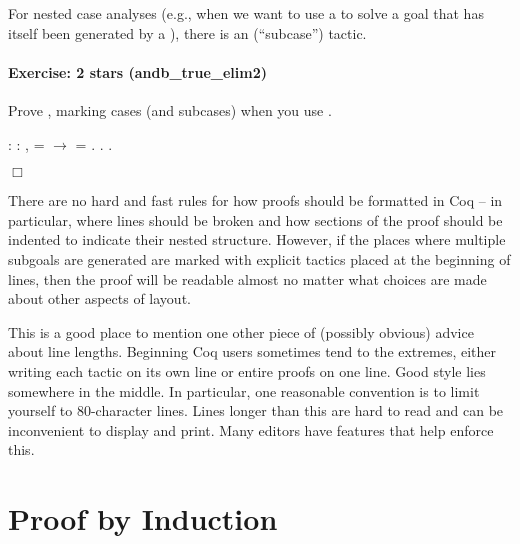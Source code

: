 \documentclass[12pt]{report}
\begin{document}
    For nested case analyses (e.g., when we want to use a 
    to solve a goal that has itself been generated by a ),
    there is an  (``subcase'') tactic. 

\paragraph{Exercise: 2 stars (andb\_true\_elim2)}

 Prove , marking cases (and subcases) when
    you use . \begin{coqdoccode}
\coqdocemptyline
\coqdocnoindent
{}  : \coqdockw{\ensuremath{\forall}}   : ,\coqdoceol
\coqdocindent{1.00em}
   =  \ensuremath{\rightarrow}  = .\coqdoceol
\coqdocnoindent
{}.\coqdoceol
 .\coqdoceol
\end{coqdoccode}
\ensuremath{\Box} 

 There are no hard and fast rules for how proofs should be
    formatted in Coq -- in particular, where lines should be broken
    and how sections of the proof should be indented to indicate their
    nested structure.  However, if the places where multiple subgoals
    are generated are marked with explicit  tactics placed at
    the beginning of lines, then the proof will be readable almost no
    matter what choices are made about other aspects of layout.


    This is a good place to mention one other piece of (possibly
    obvious) advice about line lengths.  Beginning Coq users sometimes
    tend to the extremes, either writing each tactic on its own line
    or entire proofs on one line.  Good style lies somewhere in the
    middle.  In particular, one reasonable convention is to limit
    yourself to 80-character lines.  Lines longer than this are hard
    to read and can be inconvenient to display and print.  Many
    editors have features that help enforce this. \begin{coqdoccode}
\coqdocemptyline
\end{coqdoccode}
\section{Proof by Induction}
\end{document}
